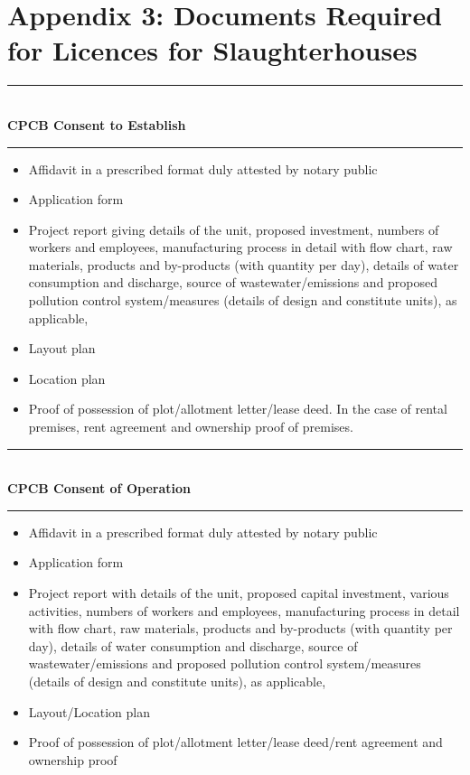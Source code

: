 \documentclass[a4paper, 12pt, twoside]{article}
\begin{document}
\section*{Appendix 3: Documents Required for Licences for Slaughterhouses}
\noindent\rule{16cm}{0.4pt} \\
\textbf{CPCB Consent to Establish} \\
\noindent\rule{16cm}{0.4pt}
\begin{itemize}[noitemsep]
\item Affidavit in a prescribed format duly attested by notary public 
\item Application form 
\item Project report giving details of the unit, proposed investment, numbers of workers and employees, manufacturing process in detail with flow chart, raw materials, products and by-products (with quantity per day), details of water consumption and discharge, source of wastewater/emissions and proposed pollution control system/measures (details of design and constitute units), as applicable, 
\item Layout plan 
\item Location plan 
\item Proof of possession of plot/allotment letter/lease deed. In the case of rental premises, rent agreement and ownership proof of premises. 
\end{itemize}
\noindent\rule{16cm}{0.4pt}\\
\textbf{CPCB Consent of Operation}
	\\
\noindent\rule{16cm}{0.2pt}
\begin{itemize}[noitemsep]
\item Affidavit in a prescribed format duly attested by notary public 
\item Application form 
\item Project report with details of the unit, proposed capital investment, various activities, numbers of workers and employees, manufacturing process in detail with flow chart, raw materials, products and by-products (with quantity per day), details of water consumption and discharge, source of wastewater/emissions and proposed pollution control system/measures (details of design and constitute units), as applicable, 
\item Layout/Location plan
\item Proof of possession of plot/allotment letter/lease deed/rent agreement and ownership proof 
\end{itemize}
\end{document}
